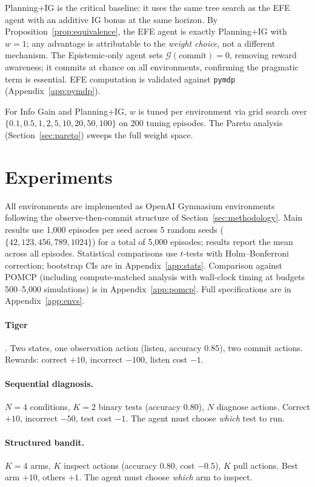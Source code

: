 \documentclass{article}
\begin{document}
Planning+IG is the critical baseline: it uses the same tree search as the EFE agent with an additive IG bonus at the same horizon. By Proposition~\ref{prop:equivalence}, the EFE agent is exactly Planning+IG with $w{=}1$; any advantage is attributable to the \emph{weight choice}, not a different mechanism. The Epistemic-only agent sets $\mathcal{G}(\text{commit}) = 0$, removing reward awareness; it commits at chance on all environments, confirming the pragmatic term is essential. EFE computation is validated against \texttt{pymdp} \citep{heins2022} (Appendix~\ref{app:pymdp}).

For Info Gain and Planning+IG, $w$ is tuned per environment via grid search over $\{0.1, 0.5, 1, 2, 5, 10, 20, 50, 100\}$ on 200 tuning episodes. The Pareto analysis (Section~\ref{sec:pareto}) sweeps the full weight space.

\section{Experiments}

All environments are implemented as OpenAI Gymnasium environments following the observe-then-commit structure of Section~\ref{sec:methodology}. Main results use 1{,}000 episodes per seed across 5 random seeds ($\{42, 123, 456, 789, 1024\}$) for a total of 5{,}000 episodes; results report the mean across all episodes. Statistical comparisons use $t$-tests with Holm--Bonferroni correction; bootstrap CIs are in Appendix~\ref{app:stats}. Comparison against POMCP (including compute-matched analysis with wall-clock timing at budgets 500--5{,}000 simulations) is in Appendix~\ref{app:pomcp}. Full specifications are in Appendix~\ref{app:envs}.

\paragraph{Tiger} \citep{kaelbling1998}. Two states, one observation action (listen, accuracy 0.85), two commit actions. Rewards: correct $+10$, incorrect $-100$, listen cost $-1$.

\paragraph{Sequential diagnosis.} $N{=}4$ conditions, $K{=}2$ binary tests (accuracy 0.80), $N$ diagnose actions. Correct $+10$, incorrect $-50$, test cost $-1$. The agent must choose \emph{which} test to run.

\paragraph{Structured bandit.} $K{=}4$ arms, $K$ inspect actions (accuracy 0.80, cost $-0.5$), $K$ pull actions. Best arm $+10$, others $+1$. The agent must choose \emph{which} arm to inspect.
\end{document}
